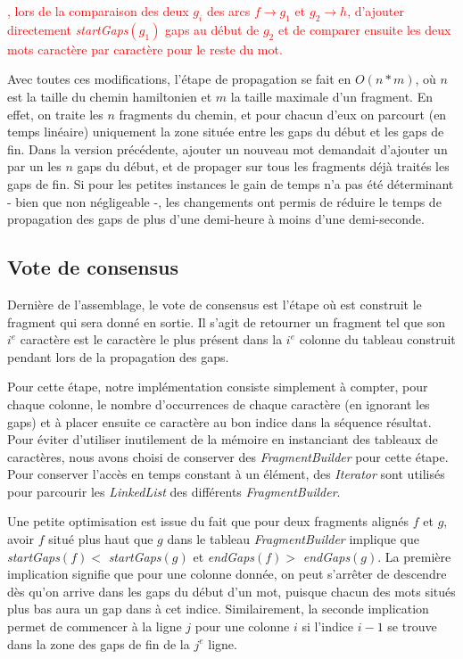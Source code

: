 \documentclass{article}
\begin{document}
\textcolor{red}{, lors de la comparaison des deux $g_i$ des arcs $f \to g_1$ et $ g_2 \to h$, d'ajouter directement \textit{startGaps}$(g_1)$ gaps au début de $g_2$ et de comparer ensuite les deux mots caractère par caractère pour le reste du mot.}

Avec toutes ces modifications, l'étape de propagation se fait en $O(n*m)$, où $n$ est la taille du chemin hamiltonien et $m$ la taille maximale d'un fragment. En effet, on traite les $n$ fragments du chemin, et pour chacun d'eux on parcourt (en temps linéaire) uniquement la zone située entre les gaps du début et les gaps de fin. Dans la version précédente, ajouter un nouveau mot demandait d'ajouter un par un les $n$ gaps du début, et de propager sur tous les fragments déjà traités les gaps de fin. Si pour les petites instances le gain de temps n'a pas été déterminant - bien que non négligeable -, les changements ont permis de réduire le temps de propagation des gaps de plus d'une demi-heure à moins d'une demi-seconde.


\subsection{Vote de consensus}

Dernière de l'assemblage, le vote de consensus est l'étape où est construit le fragment qui sera donné en sortie. Il s'agit de retourner un fragment tel que son $i^e$ caractère est le caractère le plus présent dans la $i^e$ colonne du tableau construit pendant lors de la propagation des gaps.

Pour cette étape, notre implémentation consiste simplement à compter, pour chaque colonne, le nombre d’occurrences de chaque caractère (en ignorant les gaps) et à placer ensuite ce caractère au bon indice dans la séquence résultat.
Pour éviter d'utiliser inutilement de la mémoire en instanciant des tableaux de caractères, nous avons choisi de conserver des \textit{FragmentBuilder} pour cette étape. Pour conserver l'accès en temps constant à un élément, des \textit{Iterator} sont utilisés pour parcourir les \textit{LinkedList} des différents \textit{FragmentBuilder}.

Une petite optimisation est issue du fait que pour deux fragments alignés $f$ et $g$, avoir $f$ situé plus haut que $g$ dans le tableau \textit{FragmentBuilder} implique que \textit{startGaps}$(f) < $  \textit{startGaps}$(g)$ et \textit{endGaps}$(f) > $  \textit{endGaps}$(g)$. La première implication signifie que pour une colonne donnée, on peut s'arrêter de descendre dès qu'on arrive dans les gaps du début d'un mot, puisque chacun des mots situés plus bas aura un gap dans à cet indice. Similairement, la seconde implication permet de commencer à la ligne $j$ pour une colonne $i$ si l'indice $i-1$ se trouve dans la zone des gaps de fin de la $j^e$ ligne. 
\end{document}
